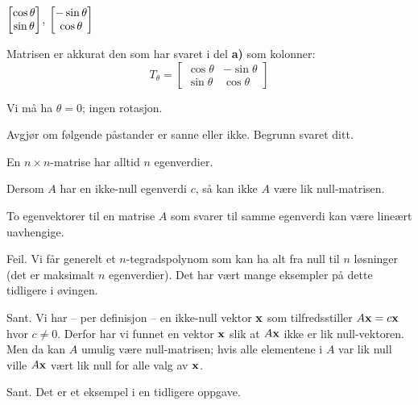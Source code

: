 \begin{losning}

\begin{punkt}
$\begin{bmatrix} \cos\theta \\ \sin\theta \end{bmatrix}$, $\begin{bmatrix} -\sin\theta \\ \cos\theta \end{bmatrix}$
\end{punkt}

\begin{punkt}
Matrisen er akkurat den som har svaret i del \textbf{a)} som kolonner:
$$T_\theta=\begin{bmatrix}
\cos\theta & -\sin\theta\\
\sin\theta & \cos\theta
\end{bmatrix}$$
\end{punkt}

\begin{punkt}
Vi må ha $\theta=0$; ingen rotasjon.
\end{punkt}

\end{losning}

\begin{oppgave}
Avgjør om følgende påstander er sanne eller ikke. Begrunn svaret ditt.

\begin{punkt}
En $n\times n$-matrise har alltid $n$ egenverdier.
\end{punkt}

\begin{punkt}
Dersom $A$ har en ikke-null egenverdi $c$, så kan ikke $A$ være lik null-matrisen.
\end{punkt}


\begin{punkt}
To egenvektorer til en matrise $A$ som svarer til samme egenverdi kan være lineært uavhengige.
\end{punkt}



\end{oppgave}

\begin{losning}

\begin{punkt}
Feil. Vi får generelt et $n$-tegradspolynom som kan ha alt fra null til $n$ løsninger (det er maksimalt $n$ egenverdier). Det har vært mange eksempler på dette tidligere i øvingen.
\end{punkt}

\begin{punkt}
Sant. Vi har -- per definisjon -- en ikke-null vektor $\mathbf{x}$ som tilfredsstiller $A\mathbf{x}=c\mathbf{x}$ hvor $c\neq 0$. Derfor har vi funnet en vektor $\mathbf{x}$ slik at $A\mathbf{x}$ ikke er lik null-vektoren. Men da kan $A$ umulig være null-matrisen; hvis alle elementene i $A$ var lik null ville $A\mathbf{x}$ vært lik null for alle valg av $\mathbf{x}$.
\end{punkt}


\begin{punkt}
Sant. Det er et eksempel i en tidligere oppgave.
\end{punkt}

\end{losning}

